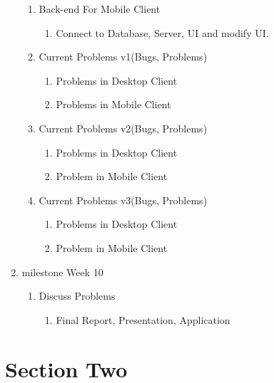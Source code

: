 \documentclass{article}
\begin{document}
\begin{enumerate}[Level 1:]
\begin{enumerate}[1]
			\item Back-end For Mobile Client
			\begin{enumerate}[a]
				\item Connect to Database, Server, UI and modify UI.
			\end{enumerate}
			
			\item Current Problems v1(Bugs, Problems)
			\begin{enumerate}[a]
				\item Problems in Desktop Client
				\item Problems in Mobile Client
			\end{enumerate}
			
			\item Current Problems v2(Bugs, Problems)
			\begin{enumerate}[a]
				\item Problems in Desktop Client
				\item Problem in Mobile Client
			\end{enumerate}
			
			\item Current Problems v3(Bugs, Problems)
			\begin{enumerate}[a]
				\item Problems in Desktop Client
				\item Problem in Mobile Client
			\end{enumerate}
		\end{enumerate}
		
		\item milestone Week 10
		
		\begin{enumerate}[1]
			\item Discuss Problems
			\begin{enumerate}[a]
				\item Final Report, Presentation, Application
			\end{enumerate}
			
		\end{enumerate}
		
	\end{enumerate}
	
	\section{Section Two}
	
\end{document}
